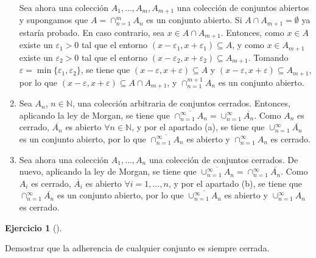 \documentclass[
  a4paper,
]{scrreport}
\theoremstyle{definition}
\newtheorem{exercise}{Ejercicio}[chapter]
\theoremstyle{remark}
\begin{document}
\begin{tcolorbox}
\begin{enumerate}
  Sea ahora una colección \(A_1,\ldots,A_m,A_{m+1}\) una colección de
  conjuntos abiertos y supongamos que \(A=\cap_{n=1}^m A_n\) es un
  conjunto abierto. Si \(A\cap A_{m+1}=\emptyset\) ya estaría probado.
  En caso contrario, sea \(x\in A\cap A_{m+1}\). Entonces, como
  \(x\in A\) existe un \(\varepsilon_1>0\) tal que el entorno
  \((x-\varepsilon_1, x+\varepsilon_1)\subseteq A\), y como
  \(x\in A_{m+1}\) existe un \(\varepsilon_2>0\) tal que el entorno
  \((x-\varepsilon_2, x+\varepsilon_2)\subseteq A_{m+1}\). Tomando
  \(\varepsilon=\min\{\varepsilon_1,\varepsilon_2\}\), se tiene que
  \((x-\varepsilon, x+\varepsilon)\subseteq A\) y
  \((x-\varepsilon, x+\varepsilon)\subseteq A_{m+1}\), por lo que
  \((x-\varepsilon, x+\varepsilon)\subseteq A\cap A_{m+1}\), y
  \(\cap_{n=1}^{m+1} A_n\) es un conjunto abierto.
\item
  Sea \(A_n\), \(n\in\mathbb{N}\), una colección arbitraria de conjuntos
  cerrados. Entonces, aplicando la ley de Morgan, se tiene que
  \(\overline{\cap_{n=1}^\infty A_n}= \cup_{n=1}^\infty \overline{A_n}\).
  Como \(A_n\) es cerrado, \(\overline{A_n}\) es abierto
  \(\forall n\in\mathbb{N}\), y por el apartado (a), se tiene que
  \(\cup_{n=1}^\infty \overline{A_n}\) es un conjunto abierto, por lo
  que \(\overline{\cap_{n=1}^\infty A_n}\) es abierto y
  \(\cap_{n=1}^\infty A_n\) es cerrado.
\item
  Sea ahora una colección \(A_1,\ldots,A_n\) una colección de conjuntos
  cerrados. De nuevo, aplicando la ley de Morgan, se tiene que
  \(\overline{\cup_{n=1}^\infty A_n}= \cap_{n=1}^\infty \overline{A_n}\).
  Como \(A_i\) es cerrado, \(\overline{A_i}\) es abierto
  \(\forall i=1, \ldots, n\), y por el apartado (b), se tiene que
  \(\cap_{n=1}^\infty \overline{A_n}\) es un conjunto abierto, por lo
  que \(\overline{\cup_{n=1}^\infty A_n}\) es abierto y
  \(\cup_{n=1}^\infty A_n\) es cerrado.
\end{enumerate}

\end{tcolorbox}

\leavevmode{}%
\begin{exercise}[]\label{exr-adherencia-cerrada}

Demostrar que la adherencia de cualquier conjunto es siempre cerrada.

\end{exercise}
\end{document}

